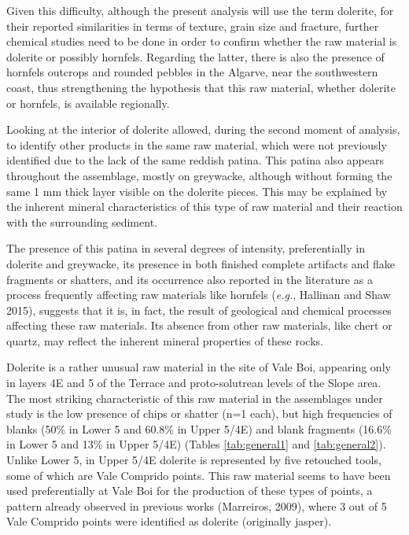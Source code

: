 \documentclass[12pt,twoside]{reedthesis}
\begin{document}
Given this difficulty, although the present analysis will use the term dolerite, for their reported similarities in terms of texture, grain size and fracture, further chemical studies need to be done in order to confirm whether the raw material is dolerite or possibly hornfels. Regarding the latter, there is also the presence of hornfels outcrops and rounded pebbles in the Algarve, near the southwestern coast, thus strengthening the hypothesis that this raw material, whether dolerite or hornfels, is available regionally.

Looking at the interior of dolerite allowed, during the second moment of analysis, to identify other products in the same raw material, which were not previously identified due to the lack of the same reddish patina. This patina also appears throughout the assemblage, mostly on greywacke, although without forming the same 1 mm thick layer visible on the dolerite pieces. This may be explained by the inherent mineral characteristics of this type of raw material and their reaction with the surrounding sediment.

The presence of this patina in several degrees of intensity, preferentially in dolerite and greywacke, its presence in both finished complete artifacts and flake fragments or shatters, and its occurrence also reported in the literature as a process frequently affecting raw materials like hornfels (\emph{e.g.}, Hallinan and Shaw 2015), suggests that it is, in fact, the result of geological and chemical processes affecting these raw materials. Its absence from other raw materials, like chert or quartz, may reflect the inherent mineral properties of these rocks.

Dolerite is a rather unusual raw material in the site of Vale Boi, appearing only in layers 4E and 5 of the Terrace and proto-solutrean levels of the Slope area. The most striking characteristic of this raw material in the assemblages under study is the low presence of chips or shatter (n=1 each), but high frequencies of blanks (50\% in Lower 5 and 60.8\% in Upper 5/4E) and blank fragments (16.6\% in Lower 5 and 13\% in Upper 5/4E) (Tables \ref{tab:general1} and \ref{tab:general2}). Unlike Lower 5, in Upper 5/4E dolerite is represented by five retouched tools, some of which are Vale Comprido points. This raw material seems to have been used preferentially at Vale Boi for the production of these types of points, a pattern already observed in previous works (Marreiros, 2009), where 3 out of 5 Vale Comprido points were identified as dolerite (originally jasper).
\end{document}
